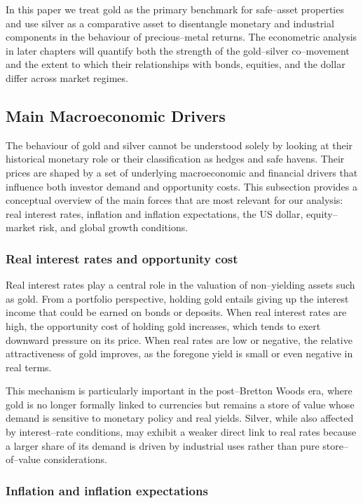 In this paper we treat gold as the primary benchmark for safe–asset properties and use
silver as a comparative asset to disentangle monetary and industrial components in the
behaviour of precious–metal returns. The econometric analysis in later chapters will
quantify both the strength of the gold–silver co–movement and the extent to which their
relationships with bonds, equities, and the dollar differ across market regimes.
\subsection{Main Macroeconomic Drivers}

The behaviour of gold and silver cannot be understood solely by looking at their historical
monetary role or their classification as hedges and safe havens. Their prices are shaped by
a set of underlying macroeconomic and financial drivers that influence both investor demand
and opportunity costs. This subsection provides a conceptual overview of the main forces
that are most relevant for our analysis: real interest rates, inflation and inflation
expectations, the US dollar, equity–market risk, and global growth conditions.
\subsubsection{Real interest rates and opportunity cost}

Real interest rates play a central role in the valuation of non–yielding assets such as
gold. From a portfolio perspective, holding gold entails giving up the interest income that
could be earned on bonds or deposits. When real interest rates are high, the opportunity
cost of holding gold increases, which tends to exert downward pressure on its price. When
real rates are low or negative, the relative attractiveness of gold improves, as the
foregone yield is small or even negative in real terms.

This mechanism is particularly important in the post–Bretton Woods era, where gold is no
longer formally linked to currencies but remains a store of value whose demand is sensitive
to monetary policy and real yields. Silver, while also affected by interest–rate
conditions, may exhibit a weaker direct link to real rates because a larger share of its
demand is driven by industrial uses rather than pure store–of–value considerations.
\subsubsection{Inflation and inflation expectations}

